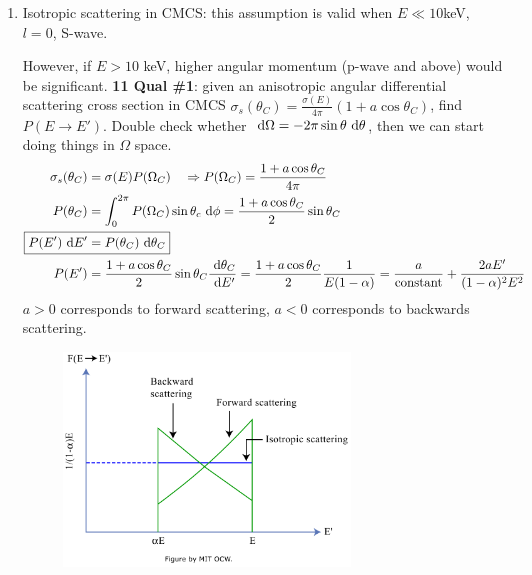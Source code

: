 \documentclass{school-22.101-notes}
\begin{document}
\begin{enumerate}
\begin{enumerate}
\item Isotropic scattering in CMCS: this assumption is valid when $E \ll 10 $keV, $l=0$, S-wave. 

However, if $E > 10$ keV, higher angular momentum (p-wave and above) would be significant. 
\textbf{11 Qual \#1}: given an anisotropic angular differential scattering cross section in CMCS $\sigma_s (\theta_C) = \frac{\sigma (E)}{4 \pi} ( 1 + a \cos \theta_C)$, find $P(E \to E')$. Double check whether $\mbox{ }\mathrm{d} \Omega = - 2 \pi \sin \theta \mbox{ }\mathrm{d} \theta$, then we can start doing things in $\Omega$ space. 
\begin{align}
\sigma_s(\theta_C) &= \sigma(E) P(\Omega_C) \fsp \fsp \fsp \Rightarrow P(\Omega_C) = \frac{1 + a \cos \theta_C}{4 \pi} \notag \\
 P(\theta_C) &= \int_0^{2\pi} P(\Omega_C) \sin \theta_c \dphi =  \frac{1 + a \cos \theta_C}{2} \sin \theta_C \notag \\
\Aboxed{ P(E') \dE' &= P(\theta_C) \dtheta_C} \notag \\
P(E^{\prime}) &= \frac{1 + a \cos \theta_C}{2} \sin \theta_C \frac{\dtheta_C}{\dE^{\prime}} = \frac{1 + a \cos \theta_C}{2}  \frac{1}{E(1-\alpha)} = \frac{a}{\mbox{constant}} + \frac{2 a E^{\prime}}{(1-\alpha)^2 E^2} \notag
\end{align}
$a>0$ corresponds to forward scattering, $a<0$ corresponds to backwards scattering. 

\begin{figure}
    \centering
    \includegraphics[width=3in]{images/ni/p-wave-approx.png}
\end{figure}
\end{enumerate}



\end{enumerate}
\end{document}
